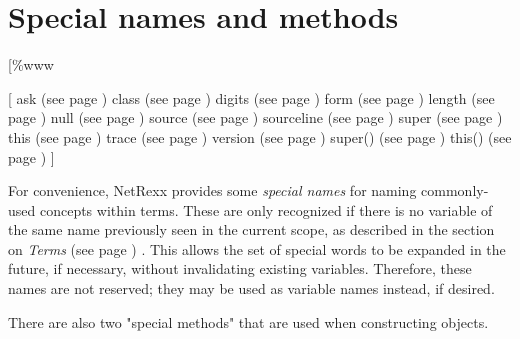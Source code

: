 \chapter{Special names and methods}\label{"id"}
[\%www
 
[ ask (see page \pageref{refswask}) 
 class (see page \pageref{refswclass}) 
 digits (see page \pageref{refswdigit}) 
 form (see page \pageref{refswform}) 
 length (see page \pageref{refswleng}) 
 null (see page \pageref{refswnull}) 
 source (see page \pageref{refswsourc}) 
 sourceline (see page \pageref{refswsourl}) 
 super (see page \pageref{refswsuper}) 
 this (see page \pageref{refswthis}) 
 trace (see page \pageref{refswtrace}) 
 version (see page \pageref{refswvers}) 
 super() (see page \pageref{refspecm}) 
 this() (see page \pageref{refspecm}) ]
 
For convenience, NetRexx provides some \emph{special names} for naming
commonly-used concepts within terms.
These are only recognized if there is no variable of the same name
previously seen in the current scope, as described in the section on
 \emph{Terms} (see page \pageref{refterms}) .
This allows the set of special words to be expanded in the future, if
necessary, without invalidating existing variables.  Therefore, these
names are not reserved; they may be used as variable names instead, if
desired.
 
There are also two "special methods" that are used when
constructing objects.
\subsection{}\label{"id"}
 
